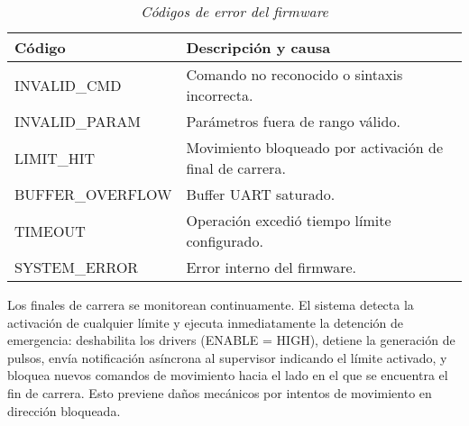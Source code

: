 \begin{table}[H]
\centering
\begin{tabular}{|l|p{9cm}|}
\hline
Código & Descripción y causa \\
\hline
INVALID\_CMD & Comando no reconocido o sintaxis incorrecta. \\
\hline
INVALID\_PARAM & Parámetros fuera de rango válido. \\
\hline
LIMIT\_HIT & Movimiento bloqueado por activación de final de carrera. \\
\hline
BUFFER\_OVERFLOW & Buffer UART saturado. \\
\hline
TIMEOUT & Operación excedió tiempo límite configurado. \\
\hline
SYSTEM\_ERROR & Error interno del firmware. \\
\hline
\end{tabular}
\caption{\textit{Códigos de error del firmware}}
\label{tab:codigos_error}
\end{table}

Los finales de carrera se monitorean continuamente. El sistema detecta la activación de cualquier límite y ejecuta inmediatamente la detención de emergencia: deshabilita los drivers (ENABLE = HIGH), detiene la generación de pulsos, envía notificación asíncrona al supervisor indicando el límite activado, y bloquea nuevos comandos de movimiento hacia el lado en el que se encuentra el fin de carrera. Esto previene daños mecánicos por intentos de movimiento en dirección bloqueada.
